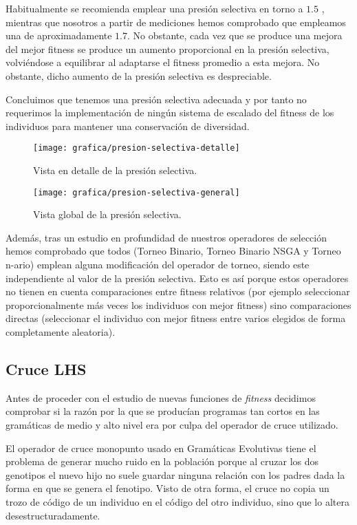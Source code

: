 Habitualmente se recomienda emplear una presión selectiva en torno a $1.5$ \cite{whitley1989genitor}, mientras que nosotros a partir de mediciones hemos comprobado que empleamos una de aproximadamente $1.7$. No obstante, cada vez que se produce una mejora del mejor fitness  se produce un aumento proporcional en la presión selectiva, volviéndose a equilibrar al adaptarse el fitness promedio a esta mejora. No obstante, dicho aumento de la presión selectiva es despreciable.
 
Concluimos que tenemos una presión selectiva adecuada y por tanto no requerimos la implementación de ningún sistema de escalado del fitness de los individuos para mantener una conservación de diversidad.
\begin{figure}[H]
\centering
\texttt{[image: grafica/presion-selectiva-detalle]}
\caption{Vista en detalle  de la presión selectiva.}
\end{figure}

\begin{figure}[H]
\centering
\texttt{[image: grafica/presion-selectiva-general]}
\caption{Vista global de la presión selectiva.}
\end{figure}

Además, tras un estudio en profundidad de nuestros operadores de selección hemos comprobado que todos (Torneo Binario, Torneo Binario NSGA y Torneo n-ario) emplean alguna modificación del operador de torneo, siendo este independiente al valor de la presión selectiva. Esto es así porque estos operadores no tienen en cuenta comparaciones entre fitness relativos (por ejemplo seleccionar proporcionalmente más veces los individuos con mejor fitness) sino comparaciones directas (seleccionar el individuo con mejor fitness entre varios elegidos de forma completamente aleatoria).

\subsection{Cruce LHS}
Antes de proceder con el estudio de nuevas funciones de \textit{fitness} decidimos comprobar si la razón por la que se producían programas tan cortos en las gramáticas de medio y alto nivel era por culpa del operador de cruce utilizado.

El operador de cruce monopunto usado en Gramáticas Evolutivas tiene el problema de generar mucho ruido en la población porque al cruzar los dos genotipos el nuevo hijo no suele guardar ninguna relación con los padres dada la forma en que se genera el fenotipo. Visto de otra forma, el cruce no copia un trozo de código de un individuo en el código del otro individuo, sino que lo altera desestructuradamente.

